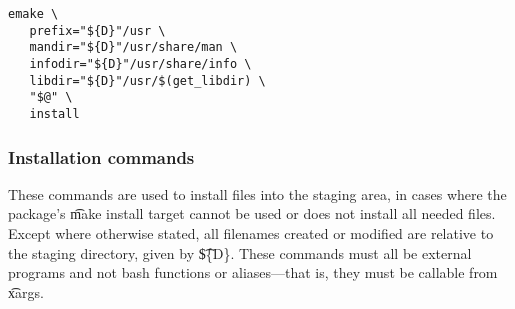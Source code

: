 \begin{description}
\begin{lstlisting}[caption=einstall command,label=lst:einstall]
emake \
   prefix="${D}"/usr \
   mandir="${D}"/usr/share/man \
   infodir="${D}"/usr/share/info \
   libdir="${D}"/usr/$(get_libdir) \
   "$@" \
   install
\end{lstlisting}

\end{description}

\subsubsection{Installation commands}
These commands are used to install files into the staging area, in cases where the package's \t{make
install} target cannot be used or does not install all needed files. Except where otherwise stated,
all filenames created or modified are relative to the staging directory, given by \t{\$\{D\}}. These
commands must all be external programs and not bash functions or aliases---that is, they must be
callable from \t{xargs}.

